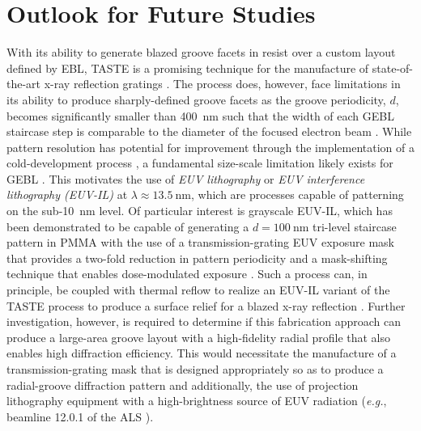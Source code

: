 \section{Outlook for Future Studies}\label{sec:summary_ch5}
With its ability to generate blazed groove facets in resist over a custom layout defined by EBL, TASTE is a promising technique for the manufacture of state-of-the-art x-ray reflection gratings \cite[\emph{cf.\@} \cref{sec:TASTE_ch5}]{McCoy18,McCoy20}. 
The process does, however, face limitations in its ability to produce sharply-defined groove facets as the groove periodicity, $d$, becomes significantly smaller than \SI{400}{\nm} such that the width of each GEBL staircase step is comparable to the diameter of the focused electron beam \cite{McCurdy20}. 
While pattern resolution has potential for improvement through the implementation of a cold-development process \cite{Ocola06}, a fundamental size-scale limitation likely exists for GEBL \cite{Fallica17}. 
This motivates the use of \emph{EUV lithography} \cite{Wu07,Tallents10} or \emph{EUV interference lithography (EUV-IL)} \cite{Auzelyte09} at $\lambda \approx \SI{13.5}{\nm}$, which are processes capable of patterning on the sub-\SI{10}{\nm} level. 
Of particular interest is grayscale EUV-IL, which has been demonstrated to be capable of generating a $d = \SI{100}{\nm}$ tri-level staircase pattern in PMMA with the use of a transmission-grating EUV exposure mask that provides a two-fold reduction in pattern periodicity and a mask-shifting technique that enables dose-modulated exposure \cite{Fallica17,Buitrago16}. 
Such a process can, in principle, be coupled with thermal reflow to realize an EUV-IL variant of the TASTE process to produce a surface relief for a blazed x-ray reflection \cite{Fallica17,Schleunitz14}. 
Further investigation, however, is required to determine if this fabrication approach can produce a large-area groove layout with a high-fidelity radial profile that also enables high diffraction efficiency. 
This would necessitate the manufacture of a transmission-grating mask that is designed appropriately so as to produce a radial-groove diffraction pattern and additionally, the use of projection lithography equipment with a high-brightness source of EUV radiation (\emph{e.g.}, beamline 12.0.1 of the ALS \cite{ALS_EUVlitho}). 

